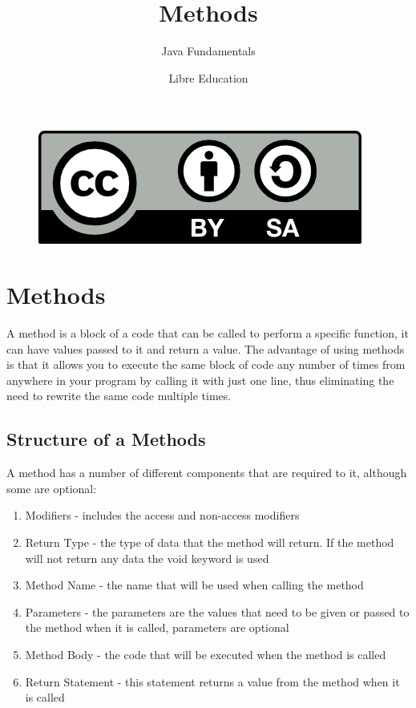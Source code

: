 \documentclass[a4paper]{article}
\title{Methods}
\subtitle{Java Fundamentals}
\date{}
\author{Libre Education}
\begin{document}
\maketitle


\begin{figure}[b]
\includegraphics{BY-SA}
\centering
\end{figure}

\newpage

\section*{Methods}

A method is a block of a code that can be called to perform a specific function, it can have values passed to it and return a value. The advantage of using methods is that it allows you to execute the same block of code any number of times from anywhere in your program by calling it with just one line, thus eliminating the need to rewrite the same code multiple times.

\subsection*{Structure of a Methods}
A method has a number of different components that are required to it, although some are optional:

\begin{enumerate}

\item Modifiers - includes the access and non-access modifiers
\item Return Type - the type of data that the method will return. If the method will not return any data the void keyword is used
\item Method Name - the name that will be used when calling the method
\item Parameters - the parameters are the values that need to be given or passed to the method when it is called, parameters are optional
\item Method Body - the code that will be executed when the method is called
\item Return Statement - this statement returns a value from the method when it is called

\end{enumerate}
\end{document}
